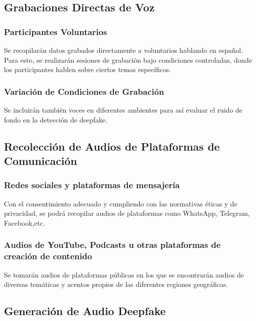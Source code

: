 \subsection{Grabaciones Directas de Voz}

\subsubsection{Participantes Voluntarios}

Se recopilarán datos grabados directamente a voluntarios hablando en español. Para esto, se realizarán sesiones de grabación bajo condiciones controladas, donde los participantes hablen sobre ciertos temas específicos.

\subsubsection{Variación de Condiciones de Grabación}

Se incluirán también voces en diferentes ambientes para así evaluar el ruido de fondo en la detección de deepfake.

\subsection{Recolección de Audios de Plataformas de Comunicación}

\subsubsection{Redes sociales y plataformas de mensajería}

Con el consentimiento adecuado y cumpliendo con las normativas éticas y de privacidad, se podrá recopilar audios de plataformas como WhatsApp, Telegram, Facebook,etc.

\subsubsection{Audios de YouTube, Podcasts u otras plataformas de creación de contenido}

Se tomarán audios de plataformas públicas en los que se encontrarán audios de diversas temáticas y acentos propios de las diferentes regiones geográficas.

\subsection{Generación de Audio Deepfake}


